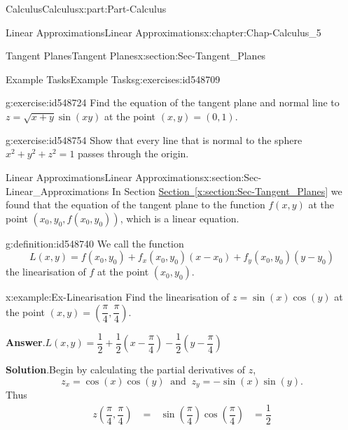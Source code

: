 \documentclass[oneside,10pt,]{book}
\newcommand{\blocktitlefont}{\relax}
\newcommand{\xreffont}{\relax}
\numberwithin{equation}{section}
\newcommand{\amp}{&}
\begin{document}
\begin{partptx}{Calculus}{}{Calculus}{}{}{x:part:Part-Calculus}
\begin{chapterptx}{Linear Approximations}{}{Linear Approximations}{}{}{x:chapter:Chap-Calculus_5}
\begin{sectionptx}{Tangent Planes}{}{Tangent Planes}{}{}{x:section:Sec-Tangent_Planes}
\begin{exercises-subsection-numberless}{Example Tasks}{}{Example Tasks}{}{}{g:exercises:id548709}
\begin{divisionexercise}{2}{}{}{g:exercise:id548724}%
Find the equation of the tangent plane and normal line to \(z = \sqrt{x+y} \sin (xy)\) at the point \((x,y)=(0,1)\).%
\end{divisionexercise}%
\begin{divisionexercise}{3}{}{}{g:exercise:id548754}%
Show that every line that is normal to the sphere \(x^2+y^2+z^2 = 1\) passes through the origin.%
\end{divisionexercise}%
\end{exercises-subsection-numberless}
\end{sectionptx}
%
%
\typeout{************************************************}
\typeout{************************************************}
%
\begin{sectionptx}{Linear Approximations}{}{Linear Approximations}{}{}{x:section:Sec-Linear_Approximations}
In Section \hyperref[x:section:Sec-Tangent_Planes]{Section~{\xreffont\ref{x:section:Sec-Tangent_Planes}}} we found that the equation of the tangent plane to the function \(f(x,y)\) at the point \((x_0,y_0,f(x_0,y_0))\), which is a linear equation.%
\begin{definition}{}{g:definition:id548740}%
We call the function%
\begin{equation*}
L(x,y) = f(x_0,y_0) + f_x(x_0,y_0)(x-x_0) + f_y(x_0,y_0)(y-y_0)
\end{equation*}
the linearisation of \(f\) at the point \((x_0,y_0)\).%
\end{definition}
\begin{example}{}{x:example:Ex-Linearisation}%
Find the linearisation of \(z=\sin(x)\cos(y)\) at the point \((x,y) = \left(\dfrac{\pi}{4},\dfrac{\pi}{4} \right)\).%
\par\smallskip%
\noindent\textbf{\blocktitlefont Answer}.\hypertarget{g:answer:id548784}{}\quad{}\(L(x,y) = \dfrac{1}{2} + \dfrac{1}{2} \left( x - \dfrac{\pi}{4} \right) - \dfrac{1}{2} \left(y - \dfrac{\pi}{4} \right)\)%
\par\smallskip%
\noindent\textbf{\blocktitlefont Solution}.\hypertarget{g:solution:id548787}{}\quad{}Begin by calculating the partial derivatives of \(z\),%
\begin{equation*}
z_x = \cos(x)\cos(y) \: \text{ and } \: z_y = -\sin(x)\sin(y)\text{.}
\end{equation*}
Thus%
\begin{alignat*}{2}
z \left(\dfrac{\pi}{4},\dfrac{\pi}{4} \right) \amp = \, \, \, \, \sin \left(\dfrac{\pi}{4} \right) \cos \left(\dfrac{\pi}{4} \right) \amp = \dfrac{1}{2}\\

\end{alignat*}
\end{example}
\end{sectionptx}
\end{chapterptx}
\end{partptx}
\end{document}
